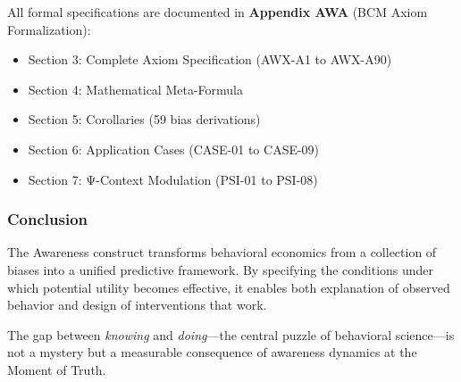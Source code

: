All formal specifications are documented in \textbf{Appendix AWA} 
(BCM Axiom Formalization):
\begin{itemize}
    \item Section 3: Complete Axiom Specification (AWX-A1 to AWX-A90)
    \item Section 4: Mathematical Meta-Formula
    \item Section 5: Corollaries (59 bias derivations)
    \item Section 6: Application Cases (CASE-01 to CASE-09)
    \item Section 7: Ψ-Context Modulation (PSI-01 to PSI-08)
\end{itemize}

\subsubsection{Conclusion}

The Awareness construct transforms behavioral economics from a collection 
of biases into a unified predictive framework. By specifying the conditions 
under which potential utility becomes effective, it enables both explanation 
of observed behavior and design of interventions that work.

The gap between \emph{knowing} and \emph{doing}—the central puzzle of 
behavioral science—is not a mystery but a measurable consequence of 
awareness dynamics at the Moment of Truth.
